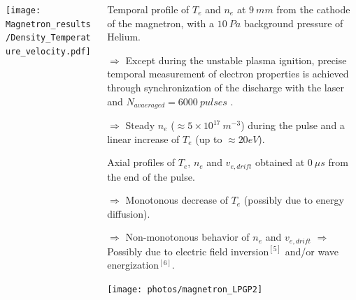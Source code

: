 \documentclass{beamer}
\begin{document}
\begin{frame}[t]
\begin{tcbposter}
{\begin{columns}
\begin{column}[T]{0.25\paperwidth}
	\vspace{0.045\paperwidth}%
 
\texttt{[image: Magnetron\_results/Density\_Temperature\_velocity.pdf]}     
    \end{column}
    
   \begin{column}[T]{0.22\paperwidth}

\vspace{0.0275\paperwidth}%

   Temporal profile of $T_{e}$ and $n_{e}$ at $9 \ mm$ from the cathode of the magnetron, with a $10 \ Pa$ background pressure of Helium.
   
   $\Rightarrow$ Except during the unstable plasma ignition, precise temporal measurement of electron properties is achieved through synchronization of the discharge with the laser and $N_{avaeraged}= 6000 \ pulses$ .
   
   $\Rightarrow$ Steady $n_{e}$ ($\approx 5\times 10^{17} \ m^{-3}$) during the pulse and a linear increase of $T_{e}$ (up to $\approx 20 eV$). 
   
\vspace{0.06\paperwidth}%
   
Axial profiles of $T_{e}$, $n_{e}$ and $v_{e,drift}$ obtained at $0 \ \mu s$ from the end of the pulse.

$\Rightarrow$ Monotonous decrease of  $T_{e}$ (possibly due to energy diffusion).

$\Rightarrow$ Non-monotonous behavior of  $n_{e}$ and $v_{e,drift}$ $\Rightarrow$ Possibly due to electric field inversion$^{[5]}$ and/or wave energization$^{[6]}$.  

   \vspace{0.046\paperwidth}%
   \texttt{[image: photos/magnetron\_LPGP2]} 
  
  
   \end{column}
\end{columns}       
    
   }
   \end{tcbposter}  
   
     \vspace{0.02\paperwidth}  
\begin{tcbposter}[
   poster = {columns=100,rows=1,colspacing=0mm , width=\paperwidth},
   no coverage ,
   boxes = {beamer,arc=10mm,colback=bleuet, colframe=bleuet, no shadow, , interior titled empty}
   ]%
   

\end{tcbposter}
\end{frame}
\end{document}
